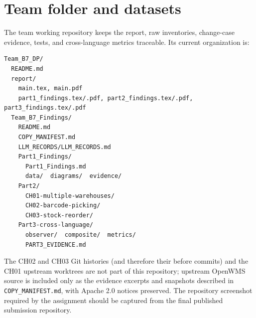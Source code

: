 \documentclass[11pt,a4paper]{article}
\newcommand{\code}[1]{\nolinkurl{#1}}
\begin{document}
\section{Team folder and datasets}
The team working repository keeps the report, raw inventories, change-case evidence, tests, and cross-language metrics traceable. Its current organization is:
\begin{verbatim}
Team_B7_DP/
  README.md
  report/
    main.tex, main.pdf
    part1_findings.tex/.pdf, part2_findings.tex/.pdf, part3_findings.tex/.pdf
  Team_B7_Findings/
    README.md
    COPY_MANIFEST.md
    LLM_RECORDS/LLM_RECORDS.md
    Part1_Findings/
      Part1_Findings.md
      data/  diagrams/  evidence/
    Part2/
      CH01-multiple-warehouses/
      CH02-barcode-picking/
      CH03-stock-reorder/
    Part3-cross-language/
      observer/  composite/  metrics/
      PART3_EVIDENCE.md
\end{verbatim}
The CH02 and CH03 Git histories (and therefore their before commits) and the CH01 upstream worktrees are not part of this repository; upstream OpenWMS source is included only as the evidence excerpts and snapshots described in \code{COPY_MANIFEST.md}, with Apache 2.0 notices preserved. The repository screenshot required by the assignment should be captured from the final published submission repository.
\end{document}

